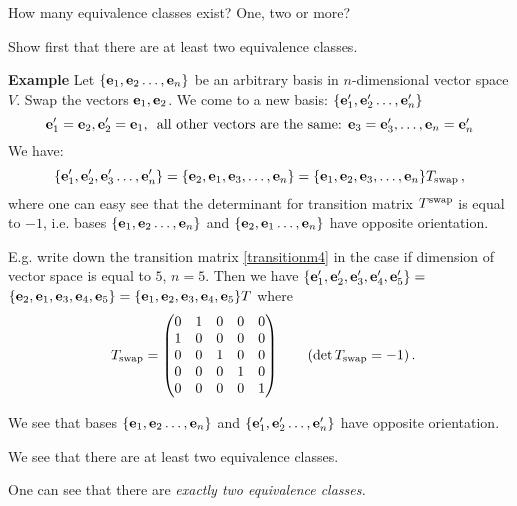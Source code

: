 \documentclass[12pt]{article}
\numberwithin{equation}{section}
\begin{document}
   How many equivalence classes exist?  One, two or more?

    Show first that there are 
at least two equivalence classes.

{\bf Example} Let  $\{{\bf e}_1,{\bf e}_2\dots,{\bf e}_n\}$ be an arbitrary 
basis in $n$-dimensional vector space $V$.
 Swap the vectors ${\bf e}_1,{\bf e}_2$. We come to a new basis:
   $\{{\bf e}'_1,{\bf e}'_2\dots,{\bf e}'_n\}$
   \begin{equation}\label{swappingbasevectors}
    {\bf e}'_1={\bf e}_2, {\bf e}_2'={\bf e}_1,\,\,\,\hbox {all other vectors are the same: ${\bf e}_3={\bf e}'_3,\dots,{\bf e}_n={\bf e}'_n$}
\end{equation}
We have:
 \begin{equation}\label{transitionm4}
\{{\bf e}'_1,{\bf e}'_2,{\bf e}'_3\dots,{\bf e}'_n\}=\{{\bf e}_2,{\bf e}_1,{\bf e}_3,\dots,{\bf e}_n\}=
      \{{\bf e}_1,{\bf e}_2,{\bf e}_3,\dots,{\bf e}_n\}T_{\rm swap}\,,
\end{equation}
where one can easy see that the determinant 
for transition matrix $T^{\rm swap}$ is equal to $-1$,
 i.e. bases $\{{\bf e}_1,{\bf e}_2\dots,{\bf e}_n\}$ and 
$\{{\bf e}_2,{\bf e}_1\dots,{\bf e}_n\}$ have opposite orientation.



E.g. write down the  transition matrix 
\eqref{transitionm4} in the case if dimension 
of vector space is equal to $5$, $n=5$.
  Then we have $\{{\bf e}'_1,{\bf e}'_2,{\bf e}'_3,{\bf e}'_4,{\bf e}'_5\}=$ 
$\{{\bf e}_2,{\bf e}_1,{\bf e}_3,{\bf e}_4,{\bf e}_5\}=
      \{{\bf e}_1,{\bf e}_2,{\bf e}_3,{\bf e}_4,{\bf e}_5\}T$ where
                           \begin{equation}
\label{transitionmatrixforswapping}
       \,\,\, T_{\rm swap}=
    \begin{pmatrix}
   0 &1 &0  &0 &0\cr
   1&0 &0 &0 &0\cr
 0 &0 & 1 &0 &0\cr
 0 &0 & 0 &1 &0\cr
0 &0 & 0 &0 &1\cr
\end{pmatrix}\qquad (\det T_{\rm swap}=-1)\,.
\end{equation}


\m

We see that bases $\{{\bf e}_1,{\bf e}_2\dots,{\bf e}_n\}$ and $\{{\bf e}'_1,{\bf e}'_2\dots,{\bf e}'_n\}$ have opposite orientation.

We see that there are at least two equivalence classes.


One can see that there are {\it 
exactly two equivalence classes.}

  

\m
\end{document}
